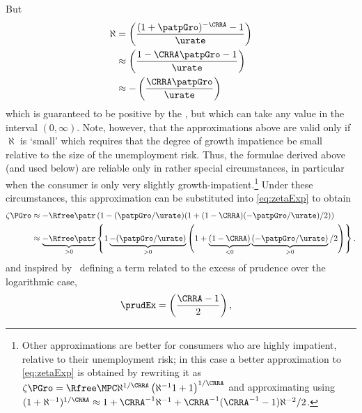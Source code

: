 \documentclass{handout}
\begin{document}
But
\begin{equation}\begin{gathered}\begin{aligned}
  \label{eq:hatpi}
  \aleph & =  \left(\frac{(1+\patpGro)^{-\CRRA}-1}{\urate}\right)
\\ & \approx  \left(\frac{1- \CRRA \patpGro-1}{\urate}\right)
\\ & \approx  -\left(\frac{\CRRA \patpGro}{\urate}\right)
\end{aligned}\end{gathered}\end{equation}
which is guaranteed to be positive by the \GICPGro, but which can take any value in the interval $(0,\infty)$.  Note, however, that the approximations above are valid only if $\aleph$ is `small' which requires that the degree of growth impatience be small relative to the size of the unemployment risk.  Thus, the formulae derived above (and used below) are reliable only in rather special circumstances, in particular when the consumer is only very slightly growth-impatient.\footnote{Other approximations are better for consumers who are highly impatient, relative to their unemployment risk; in this case a better approximation to \eqref{eq:zetaExp} is obtained by rewriting it as $\zeta\PGro = \Rfree \MPCU \aleph^{1/\CRRA} \left(\aleph^{-1}1+1\right)^{1/\CRRA}$ and approximating using $(1+\aleph^{-1})^{1/\CRRA} \approx 1 + \CRRA^{-1}\aleph^{-1}+\CRRA^{-1}(\CRRA^{-1}-1)\aleph^{-2}/2$.}  Under these circumstances, this approximation can be substituted into \eqref{eq:zetaExp} to obtain
\begin{equation}\begin{gathered}\begin{aligned}
  \zeta\PGro & \approx   -\Rfree \patr \left(1-(\patpGro/\urate)(1+(1-\CRRA)(-\patpGro/\urate)/2)\right)
\\ & \approx  \underbrace{-\Rfree \patr}_{>0} \left\{1\underbrace{-(\patpGro/\urate)}_{>0}\left(1+\underbrace{(1-\CRRA)}_{<0}\underbrace{(-\patpGro/\urate)}_{>0}/2\right)\right\} \label{eq:zetaGammaApprox}
.
\end{aligned}\end{gathered}\end{equation}
and inspired by~\cite{kimball:smallandlarge} defining a term related to the excess of prudence
over the logarithmic case,
\begin{equation}\begin{gathered}\begin{aligned}
  \prudEx & =  \left(\frac{\CRRA-1}{2}\right),
\end{aligned}\end{gathered}\end{equation}
\end{document}
